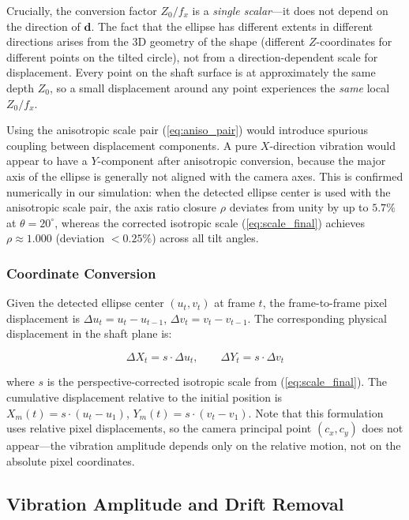 \documentclass[journal]{IEEEtran}
\begin{document}
Crucially, the conversion factor $Z_0/f_x$ is a \emph{single scalar}---it does
not depend on the direction of $\mathbf{d}$. The fact that the ellipse has
different extents in different directions arises from the 3D geometry of the
shape (different $Z$-coordinates for different points on the tilted circle),
not from a direction-dependent scale for displacement. Every point on the
shaft surface is at approximately the same depth $Z_0$, so a small displacement
around any point experiences the \emph{same} local $Z_0/f_x$.

Using the anisotropic scale pair (\ref{eq:aniso_pair}) would introduce
spurious coupling between displacement components. A pure $X$-direction
vibration would appear to have a $Y$-component after anisotropic conversion,
because the major axis of the ellipse is generally not aligned with the camera
axes. This is confirmed numerically in our simulation: when the detected
ellipse center is used with the anisotropic scale pair, the axis ratio closure
$\rho$ deviates from unity by up to $5.7\%$ at $\theta = 20^{\circ}$, whereas
the corrected isotropic scale (\ref{eq:scale_final}) achieves $\rho \approx
1.000$ (deviation $< 0.25\%$) across all tilt angles.

\subsubsection{Coordinate Conversion}

Given the detected ellipse center $(u_t, v_t)$ at frame $t$, the frame-to-frame
pixel displacement is $\Delta u_t = u_t - u_{t-1}$, $\Delta v_t = v_t - v_{t-1}$.
The corresponding physical displacement in the shaft plane is:

\begin{equation}
\Delta X_t = s \cdot \Delta u_t, \qquad
\Delta Y_t = s \cdot \Delta v_t
\label{eq:coord_conv}
\end{equation}

where $s$ is the perspective-corrected isotropic scale from (\ref{eq:scale_final}).
The cumulative displacement relative to the initial position is
$X_m(t) = s \cdot (u_t - u_1)$, $Y_m(t) = s \cdot (v_t - v_1)$. Note that
this formulation uses relative pixel displacements, so the camera principal
point $(c_x, c_y)$ does not appear---the vibration amplitude depends only on
the relative motion, not on the absolute pixel coordinates.

\subsection{Vibration Amplitude and Drift Removal}
\end{document}

